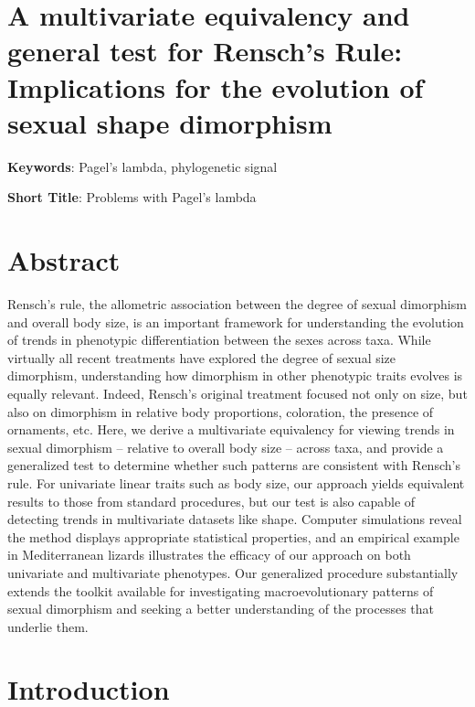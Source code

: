 \documentclass[]{article}
\date{}
\begin{document}
\section{A multivariate equivalency and general test for Rensch's Rule:
Implications for the evolution of sexual shape
dimorphism}\label{a-multivariate-equivalency-and-general-test-for-renschs-rule-implications-for-the-evolution-of-sexual-shape-dimorphism}

\hfill\break

\textbf{Keywords}: Pagel's lambda, phylogenetic signal \hfill\break

\textbf{Short Title}: Problems with Pagel's lambda \hfill\break

\section{Abstract}\label{abstract}

Rensch's rule, the allometric association between the degree of sexual
dimorphism and overall body size, is an important framework for
understanding the evolution of trends in phenotypic differentiation
between the sexes across taxa. While virtually all recent treatments
have explored the degree of sexual size dimorphism, understanding how
dimorphism in other phenotypic traits evolves is equally relevant.
Indeed, Rensch's original treatment focused not only on size, but also
on dimorphism in relative body proportions, coloration, the presence of
ornaments, etc. Here, we derive a multivariate equivalency for viewing
trends in sexual dimorphism -- relative to overall body size -- across
taxa, and provide a generalized test to determine whether such patterns
are consistent with Rensch's rule. For univariate linear traits such as
body size, our approach yields equivalent results to those from standard
procedures, but our test is also capable of detecting trends in
multivariate datasets like shape. Computer simulations reveal the method
displays appropriate statistical properties, and an empirical example in
Mediterranean lizards illustrates the efficacy of our approach on both
univariate and multivariate phenotypes. Our generalized procedure
substantially extends the toolkit available for investigating
macroevolutionary patterns of sexual dimorphism and seeking a better
understanding of the processes that underlie them.

\newpage

\section{Introduction}\label{introduction}
\end{document}
